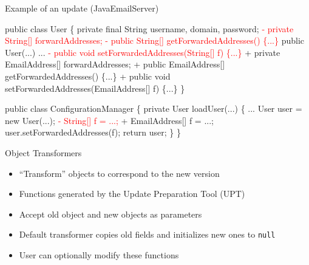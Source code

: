 \begin{frame}[fragile,shrink=5]{Example of an update (JavaEmailServer)}%
\newcommand{\removed}[1]{\textcolor{red}{- #1}}
\newcommand{\addedxx}[1]{\textcolor{OliveGreen}{+ #1}}
\begin{\ExampleCodeSize}
\begin{semiverbatim}
  public class User \{
    private final String username, domain, password;
\removed{  private String[] forwardAddresses;}
\removed{  public String[] getForwardedAddresses() \{...\}}
    public User(...) {...}
\removed{  public void setForwardedAddresses(String[] f) \{...\}}
\addedxx{  private EmailAddress[] forwardAddresses;}
\addedxx{  public EmailAddress[] getForwardedAddresses() \{...\}}
\addedxx{  public void setForwardedAddresses(EmailAddress[] f) \{...\}}
  \}

  public class ConfigurationManager \{
    private User loadUser(...) \{
       ...
       User user = new User(...);
\removed{     String[] f = ...;}
\addedxx{     EmailAddress[] f = ...;}
       user.setForwardedAddresses(f);
       return user;
    \}
  \}
\end{semiverbatim}
\end{\ExampleCodeSize}
\end{frame}

\begin{frame}{Object Transformers}%
\begin{itemize}
\item ``Transform'' objects to correspond to the new version
\item Functions generated by the Update Preparation Tool (UPT)
\item Accept old object and new objects as parameters
\item Default transformer copies old fields and initializes new ones to
\texttt{null}
\item User can optionally modify these functions
\end{itemize}
\end{frame}

